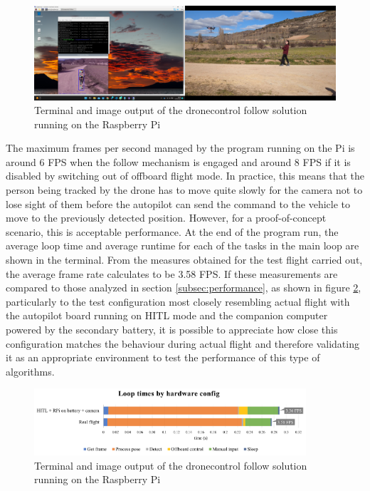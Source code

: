 \begin{figure}
  \centering
  \includegraphics[width=\textwidth, keepaspectratio]{img/video-field-test-follow.png}
  \caption{Terminal and image output of the dronecontrol follow solution running on the Raspberry Pi}
  \label{fig:flight-test-follow}
\end{figure}

The maximum frames per second managed by the program running on the Pi is around 6 FPS when the follow mechanism is engaged and around 8 FPS if it is disabled by switching out of offboard flight mode.
In practice, this means that the person being tracked by the drone has to move quite slowly for the camera not to lose sight of them before the autopilot can send the command to the vehicle to move to the previously detected position.
However, for a proof-of-concept scenario, this is acceptable performance.
At the end of the program run, the average loop time and average runtime for each of the tasks in the main loop are shown in the terminal.
From the measures obtained for the test flight carried out, the average frame rate calculates to be 3.58 FPS.
If these measurements are compared to those analyzed in section \ref{subsec:performance}, as shown in figure \ref{fig:flight-performance}, particularly to the test configuration most closely resembling actual flight with the autopilot board running on HITL mode and the companion computer powered by the secondary battery, it is possible to appreciate how close this configuration matches the behaviour during actual flight and therefore validating it as an appropriate environment to test the performance of this type of algorithms.


\begin{figure}
  \centering
  \includegraphics[width=0.9\textwidth, keepaspectratio]{img/perf-hitl-flight.png}
  \caption{Terminal and image output of the dronecontrol follow solution running on the Raspberry Pi}
  \label{fig:flight-performance}
\end{figure}
